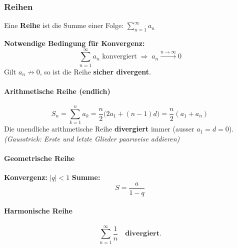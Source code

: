 \documentclass[../../zusammenfassung_AN.tex]{subfiles}
\begin{document}
	\subsubsection{Reihen}
	
	\begin{tcolorbox}[formelbox]
		Eine \textbf{Reihe} ist die Summe einer Folge:
		$\displaystyle\sum_{n=1}^{\infty} a_n$
		
		\medskip
		\textbf{Notwendige Bedingung für Konvergenz:}
		\[
		\sum_{n=1}^{\infty} a_n \text{ konvergiert} \;\Rightarrow\; a_n \xrightarrow{n\to\infty} 0
		\]
		Gilt $a_n \not\to 0$, so ist die Reihe \textbf{sicher divergent}.
	\end{tcolorbox}
	
	\paragraph{Arithmetische Reihe (endlich)}
	
	\begin{tcolorbox}[formelbox]
		\[
		S_n = \sum_{k=1}^{n} a_k = \frac{n}{2}\bigl(2a_1+(n-1)d\bigr) = \frac{n}{2}(a_1+a_n)
		\]
		Die unendliche arithmetische Reihe \textbf{divergiert} immer (ausser $a_1=d=0$). \\
		\textit{(Gausstrick: Erste und letzte Glieder paarweise addieren)}
	\end{tcolorbox}
	
	\paragraph{Geometrische Reihe}
	
	\begin{tcolorbox}[dglbox, title={Geometrische Reihe \quad $\sum_{n=0}^{\infty} a\,q^n$}]
		\textbf{Konvergenz:} $|q|<1$ \qquad
		\textbf{Summe:}
		\[
		S = \frac{a}{1-q}
		\]
	\end{tcolorbox}
	
	\paragraph{Harmonische Reihe}
	
	\begin{tcolorbox}[hinweis]
		\[
		\sum_{n=1}^{\infty} \frac{1}{n} \quad \textbf{divergiert}.
		\]
	\end{tcolorbox}
	
\end{document}
